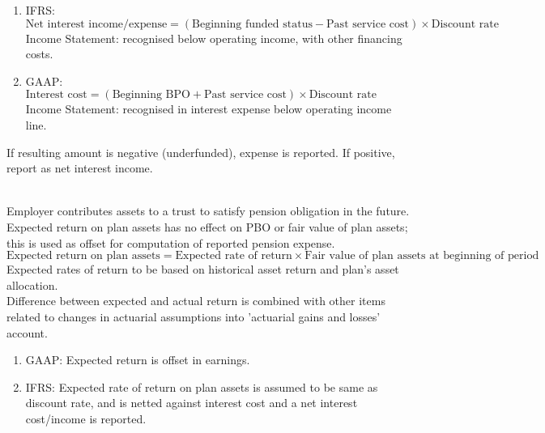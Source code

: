 \begin{definition} 
\begin{enumerate}[label=\roman*.]
\setlength{\itemsep}{0pt}
\item IFRS: $\text{Net interest income/expense} = (\text{Beginning funded status} - \text{Past service cost}) \times \text{Discount rate} \nonumber$\\
Income Statement: recognised below operating income, with other financing costs.
\item GAAP: $\text{Interest cost} = (\text{Beginning BPO} + \text{Past service cost}) \times \text{Discount rate}$\\
Income Statement: recognised in interest expense below operating income line.
\end{enumerate}
If resulting amount is negative (underfunded), expense is reported. If positive, report as net interest income.
\end{definition}

\begin{definition} \\
Employer contributes assets to a trust to satisfy pension obligation in the future.\\
Expected return on plan assets has no effect on PBO or fair value of plan assets; this is used as offset for computation of reported pension expense.
\begin{equation}
\text{Expected return on plan assets} = \text{Expected rate of return} \times \text{Fair value of plan assets at beginning of period} \nonumber 
\end{equation} 
Expected rates of return to be based on historical asset return and plan's asset allocation.\\
Difference between expected and actual return is combined with other items related to changes in actuarial assumptions into 'actuarial gains and losses' account.
\begin{enumerate}[label=\roman*.]
\setlength{\itemsep}{0pt}
\item GAAP: Expected return is offset in earnings.
\item IFRS: Expected rate of return on plan assets is assumed to be same as discount rate, and is netted against interest cost and a net interest cost/income is reported.
\end{enumerate}
\end{definition}

